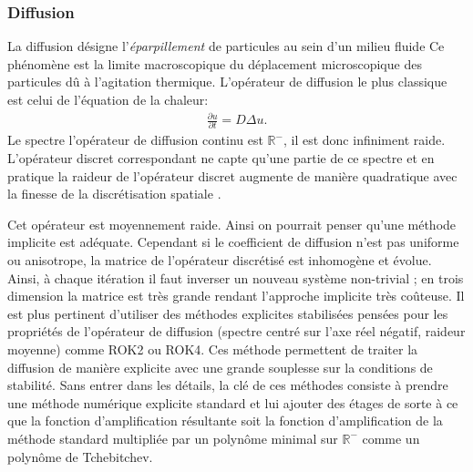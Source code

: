 \subsubsection{Diffusion}
    La diffusion désigne l'\textit{éparpillement} de particules au sein d'un milieu fluide
    Ce phénomène est la limite macroscopique du déplacement microscopique
    des particules dû à l'agitation thermique. L'opérateur de diffusion le plus classique est celui de l'équation de la chaleur:
    \begin{align} \frac{\partial u}{\partial t} = D \Delta u.\end{align}
    Le spectre l'opérateur de diffusion continu est $\mathbb R^-$, il est donc infiniment raide. 
    L'opérateur discret correspondant ne capte qu'une partie de ce spectre et 
    en pratique la raideur de l'opérateur discret augmente de manière quadratique avec la finesse de la discrétisation spatiale \cite[Chap.~9]{LeVeque2007}.\par
    Cet opérateur est moyennement raide. Ainsi on pourrait penser qu'une méthode implicite est adéquate. Cependant si 
    le coefficient de diffusion n'est pas uniforme ou anisotrope, la matrice de l'opérateur discrétisé est inhomogène et évolue. Ainsi,
    à chaque itération il faut inverser un nouveau système non-trivial ; en trois dimension la matrice est très grande rendant l'approche implicite très coûteuse.
    Il est plus pertinent d'utiliser des méthodes explicites stabilisées pensées pour les propriétés de l'opérateur de diffusion (spectre centré sur l'axe réel négatif, raideur moyenne) comme
    ROK2 ou ROK4\cite{abdulle2002fourth}. Ces méthode permettent de traiter la diffusion de manière explicite avec une grande souplesse sur la conditions de stabilité.
    Sans entrer dans les détails, la clé de ces méthodes consiste à prendre une méthode numérique explicite standard et lui ajouter des étages 
    de sorte à ce que la fonction d'amplification résultante soit la fonction d'amplification de la méthode standard multipliée par un polynôme minimal sur $\mathbb R^-$
    comme un polynôme de Tchebitchev.

